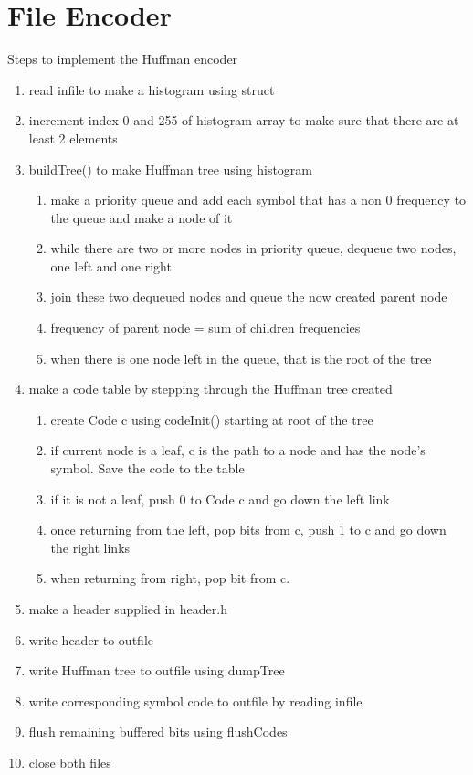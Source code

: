 \documentclass[11pt]{article}
\begin{document}
\section{File Encoder}\label{ss:encoder}
Steps to implement the Huffman encoder
\begin{enumerate}
\item read infile to make a histogram using struct
\item increment index 0 and 255 of histogram array to make sure that there are at least 2 elements
\item buildTree() to make Huffman tree using histogram
	\begin{enumerate}
	\item make a priority queue and add each symbol that has a non 0 frequency to the queue and make a node of it
	\item while there are two or more nodes in priority queue, dequeue two nodes, one left and one right
	\item join these two dequeued nodes and queue the now created parent node
	\item frequency of parent node = sum of children frequencies
	\item when there is one node left in the queue, that is the root of the tree
	\end{enumerate}
\item make a code table by stepping through the Huffman tree created
	\begin{enumerate}
	\item create Code c using codeInit() starting at root of the tree
	\item if current node is a leaf, c is the path to a node and has the node's symbol. Save the code to the table
	\item if it is not a leaf, push 0 to Code c and go down the left link
	\item once returning from the left, pop bits from c, push 1 to c and go down the right links
	\item when returning from right, pop bit from c.
	\end{enumerate}
\item make a header supplied in header.h
\item write header to outfile
\item write Huffman tree to outfile using dumpTree
\item write corresponding symbol code to outfile by reading infile
\item flush remaining buffered bits using flushCodes
\item close both files
\end{enumerate}
\end{document}
